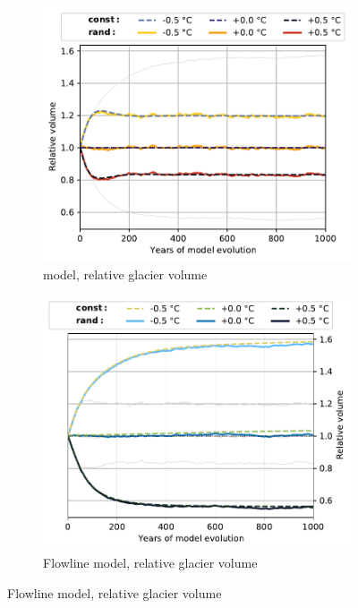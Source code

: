         \begin{figure}[t!]
          \centering
          \begin{subfigure}[b]{0.48\textwidth}
            \caption{\Vas{} model, relative glacier volume}
            \label{fig:histalp_commitment:volume_norm_const}
            \centering
            \includegraphics[width=\textwidth]{../plots/final_plots/time_series/histalp_commitment/volume_norm_vas.pdf}
          \end{subfigure}
          \hfill
          \begin{subfigure}[b]{0.48\textwidth}
            \caption{Flowline model, relative glacier volume}
            \label{fig:histalp_commitment:volume_norm_random}
            \centering
            \includegraphics[width=\textwidth]{../plots/final_plots/time_series/histalp_commitment/volume_norm_fl.pdf}

\end{subfigure}
\end{figure}
